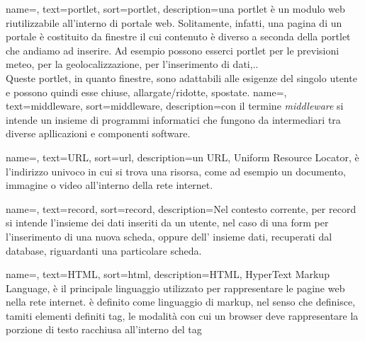 {
	name=,
	text=portlet,
	sort=portlet,
	description={una portlet è un modulo web riutilizzabile all'interno di portale web. Solitamente, infatti, una pagina di un portale è costituito da finestre il cui contenuto è diverso a seconda della portlet che andiamo ad inserire. Ad esempio possono esserci portlet per le previsioni meteo, per la geolocalizzazione, per l'inserimento di dati,.. \\
	Queste portlet, in quanto finestre, sono adattabili alle esigenze del singolo utente e possono quindi esse chiuse, allargate/ridotte, spostate.}
}
{
	name=,
	text=middleware,
	sort=middleware,
	description={con il termine \emph{middleware} si intende un insieme di programmi informatici che fungono da intermediari tra diverse apllicazioni e componenti software.}
}

{name=,
text=URL,
sort=url,
description={un URL, Uniform Resource Locator, è l'indirizzo univoco in cui si trova una risorsa, come ad esempio un documento, immagine o video all'interno della rete internet.}
}

{name=,
	text=record,
	sort=record,
	description={Nel contesto corrente, per record si intende l'insieme dei dati inseriti da un utente, nel caso di una form per l'inserimento di una nuova scheda, oppure dell' insieme dati, recuperati dal database, riguardanti una particolare scheda.}
}

{name=,
	text=HTML,
	sort=html,
	description={HTML, HyperText Markup Language, è il principale linguaggio utilizzato per rappresentare le pagine web nella rete internet. è definito come linguaggio di markup, nel senso che definisce, tamiti elementi definiti tag, le modalità con cui un browser deve rappresentare la porzione di testo racchiusa all'interno del tag}
}
